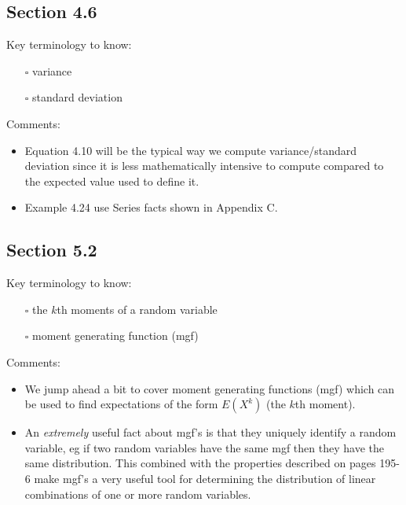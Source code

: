 \documentclass[
  letterpaper,
]{scrbook}
\providecommand{\tightlist}{%
  \setlength{\itemsep}{0pt}\setlength{\parskip}{0pt}}\usepackage{longtable,booktabs,array}
\begin{document}
\subsection*{Section 4.6}\label{section-4.6}

Key terminology to know:

\begin{itemize}
\tightlist
\item[$\square$]
  variance
\item[$\square$]
  standard deviation
\end{itemize}

Comments:

\begin{itemize}
\tightlist
\item
  Equation 4.10 will be the typical way we compute variance/standard
  deviation since it is less mathematically intensive to compute
  compared to the expected value used to define it.
\item
  Example 4.24 use Series facts shown in Appendix C.
\end{itemize}

\subsection*{Section 5.2}\label{section-5.2}

Key terminology to know:

\begin{itemize}
\tightlist
\item[$\square$]
  the \(k\)th moments of a random variable
\item[$\square$]
  moment generating function (mgf)
\end{itemize}

Comments:

\begin{itemize}
\tightlist
\item
  We jump ahead a bit to cover moment generating functions (mgf) which
  can be used to find expectations of the form \(E(X^k)\) (the \(k\)th
  moment).
\item
  An \emph{extremely} useful fact about mgf's is that they uniquely
  identify a random variable, eg if two random variables have the same
  mgf then they have the same distribution. This combined with the
  properties described on pages 195-6 make mgf's a very useful tool for
  determining the distribution of linear combinations of one or more
  random variables.
\end{itemize}
\end{document}
